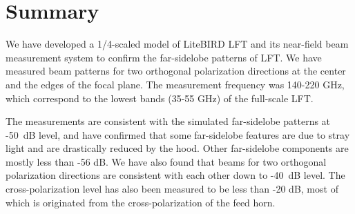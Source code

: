 \documentclass[journal]{IEEEtran}
\begin{document}
\section{Summary}
We have developed a 1/4-scaled model of LiteBIRD LFT and its near-field beam measurement system to confirm the far-sidelobe patterns of LFT. We have measured beam patterns for two orthogonal polarization directions at the center and the edges of the focal plane. The measurement frequency was 140-220 GHz, which correspond to the lowest bands (35-55 GHz) of the full-scale LFT.
\par
The measurements are consistent with the simulated far-sidelobe patterns at -50~dB level, and have confirmed that some far-sidelobe features are due to stray light and are drastically reduced by the hood. Other far-sidelobe components are mostly less than -56 dB. We have also found that beams for two orthogonal polarization directions are consistent with each other down to -40~dB level. The cross-polarization level has also been measured to be less than -20 dB, most of which is originated from the cross-polarization of the feed horn.
%
%
%
%
%
%
%
\end{document}
